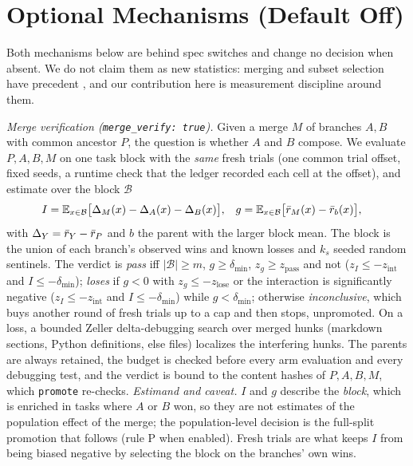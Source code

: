 \section{Optional Mechanisms (Default Off)}
\label{app:optional}

Both mechanisms below are behind spec switches and change no decision when absent. We do not claim them as new
statistics: merging and subset selection have precedent
\citep{gepa,darwinx,park2026autosaddler,shastri2026bonsai,xu2026harnesslens}, and our contribution here is
measurement discipline around them.

\emph{Merge verification (\texttt{merge\_\allowbreak verify: true}).}
Given a merge $M$ of branches $A,B$ with common ancestor $P$, the question is whether $A$ and $B$ compose. We evaluate
$P,A,B,M$ on one task block with the \emph{same} fresh trials (one common trial offset, fixed seeds, a runtime check that
the ledger recorded each cell at the offset), and estimate over the block $\mathcal{B}$
\begin{align}
  I &= \mathbb{E}_{x\in\mathcal{B}}\big[\Delta_M(x)-\Delta_A(x)-\Delta_B(x)\big], &
  g &= \mathbb{E}_{x\in\mathcal{B}}\big[\bar r_M(x)-\bar r_{b}(x)\big],
\end{align}
with $\Delta_Y=\bar r_Y-\bar r_P$ and $b$ the parent with the larger block mean. The block is the union of each branch's
observed wins and known losses and $k_s$ seeded random sentinels. The verdict is \emph{pass} iff $|\mathcal{B}|\ge m$,
$g\ge\delta_{\min}$, $z_g\ge z_{\mathrm{pass}}$ and not ($z_I\le -z_{\mathrm{int}}$ and $I\le-\delta_{\min}$);
\emph{loses} if $g<0$ with $z_g\le -z_{\mathrm{lose}}$ or the interaction is significantly negative ($z_I\le -z_{\mathrm{int}}$ and $I\le-\delta_{\min}$) while $g<\delta_{\min}$;
otherwise \emph{inconclusive}, which buys another round of fresh trials up to a cap and then stops, unpromoted. On a loss,
a bounded Zeller delta-debugging search over merged hunks (markdown sections, Python definitions, else files)
localizes the interfering hunks. The parents are always retained, the budget is checked before every arm evaluation and
every debugging test, and the verdict is bound to the content hashes of $P,A,B,M$, which \texttt{promote} re-checks.
\emph{Estimand and caveat.} $I$ and $g$ describe the \emph{block}, which is enriched in tasks where $A$ or $B$ won, so
they are not estimates of the population effect of the merge; the population-level decision is the full-split
promotion that follows (rule P when enabled). Fresh trials are what keeps $I$ from being biased negative by selecting
the block on the branches' own wins.

